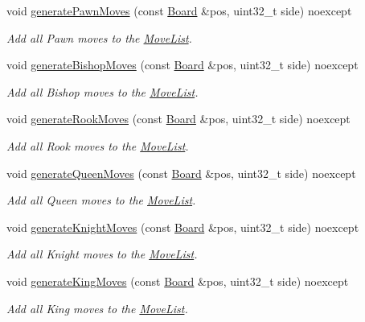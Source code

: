 \begin{DoxyCompactItemize}
void \mbox{\hyperlink{classMoveList_a309f4e2408ad522162cda7e2e778d66f}{generate\+Pawn\+Moves}} (const \mbox{\hyperlink{classBoard}{Board}} \&pos, uint32\+\_\+t side) noexcept
\begin{DoxyCompactList}\small\item\em Add all Pawn moves to the \mbox{\hyperlink{classMoveList}{Move\+List}}. \end{DoxyCompactList}\item 
void \mbox{\hyperlink{classMoveList_a65a2fdca6072299405610f1770dde58e}{generate\+Bishop\+Moves}} (const \mbox{\hyperlink{classBoard}{Board}} \&pos, uint32\+\_\+t side) noexcept
\begin{DoxyCompactList}\small\item\em Add all Bishop moves to the \mbox{\hyperlink{classMoveList}{Move\+List}}. \end{DoxyCompactList}\item 
void \mbox{\hyperlink{classMoveList_a2f10e1e4e2b5bec034656a3038b42d95}{generate\+Rook\+Moves}} (const \mbox{\hyperlink{classBoard}{Board}} \&pos, uint32\+\_\+t side) noexcept
\begin{DoxyCompactList}\small\item\em Add all Rook moves to the \mbox{\hyperlink{classMoveList}{Move\+List}}. \end{DoxyCompactList}\item 
void \mbox{\hyperlink{classMoveList_a8f0dedc3c310ad2ce503e9327c089997}{generate\+Queen\+Moves}} (const \mbox{\hyperlink{classBoard}{Board}} \&pos, uint32\+\_\+t side) noexcept
\begin{DoxyCompactList}\small\item\em Add all Queen moves to the \mbox{\hyperlink{classMoveList}{Move\+List}}. \end{DoxyCompactList}\item 
void \mbox{\hyperlink{classMoveList_aec2684c095f75d4215908b140d604635}{generate\+Knight\+Moves}} (const \mbox{\hyperlink{classBoard}{Board}} \&pos, uint32\+\_\+t side) noexcept
\begin{DoxyCompactList}\small\item\em Add all Knight moves to the \mbox{\hyperlink{classMoveList}{Move\+List}}. \end{DoxyCompactList}\item 
void \mbox{\hyperlink{classMoveList_a01f21c1bed30c674219746d10c0a7aa7}{generate\+King\+Moves}} (const \mbox{\hyperlink{classBoard}{Board}} \&pos, uint32\+\_\+t side) noexcept
\begin{DoxyCompactList}\small\item\em Add all King moves to the \mbox{\hyperlink{classMoveList}{Move\+List}}. \end{DoxyCompactList}\item 

\end{DoxyCompactItemize}
